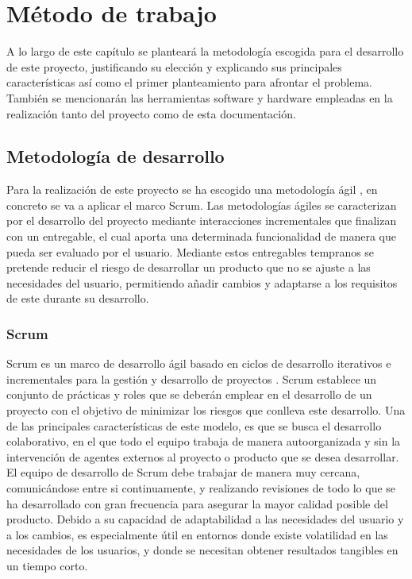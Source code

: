 \chapter{Método de trabajo}
\label{chap:metodo}

A lo largo de este capítulo se planteará la metodología escogida para el desarrollo de este proyecto, justificando su elección y explicando sus principales características así como el  primer planteamiento para afrontar el problema. También se mencionarán las herramientas software y hardware empleadas en la realización tanto del proyecto como de esta documentación.


\section{Metodología de desarrollo}

Para la realización de este proyecto se ha escogido una metodología ágil \cite{ilieva2004analyses}, en concreto se va a aplicar el marco Scrum. Las metodologías ágiles se caracterizan por el desarrollo del proyecto mediante interacciones incrementales que finalizan con un entregable, el cual aporta una determinada funcionalidad de manera que pueda ser evaluado por el usuario. Mediante estos entregables tempranos se pretende reducir el riesgo de desarrollar un producto que no se ajuste a las necesidades del usuario, permitiendo añadir cambios y adaptarse a los requisitos de este durante su desarrollo.

\subsection{Scrum}

Scrum es un marco de desarrollo ágil basado en ciclos de desarrollo iterativos e incrementales para la gestión y desarrollo de proyectos \cite{schwaber2004agile}. Scrum establece un conjunto de prácticas y roles que se deberán emplear en el desarrollo de un proyecto con el objetivo de minimizar los riesgos que conlleva este desarrollo. Una de las principales características de este modelo, es que se busca el desarrollo colaborativo, en el que todo el equipo trabaja de manera autoorganizada y sin la intervención de agentes externos al proyecto o producto que se desea desarrollar. El equipo de desarrollo de Scrum debe trabajar de manera muy cercana, comunicándose entre si continuamente, y realizando revisiones de todo lo que se ha desarrollado con gran frecuencia para asegurar la mayor calidad posible del producto. Debido a su capacidad de adaptabilidad a las necesidades del usuario y a los cambios, es especialmente útil en entornos donde existe volatilidad en las necesidades de los usuarios, y donde se necesitan obtener resultados tangibles en un tiempo corto. 

